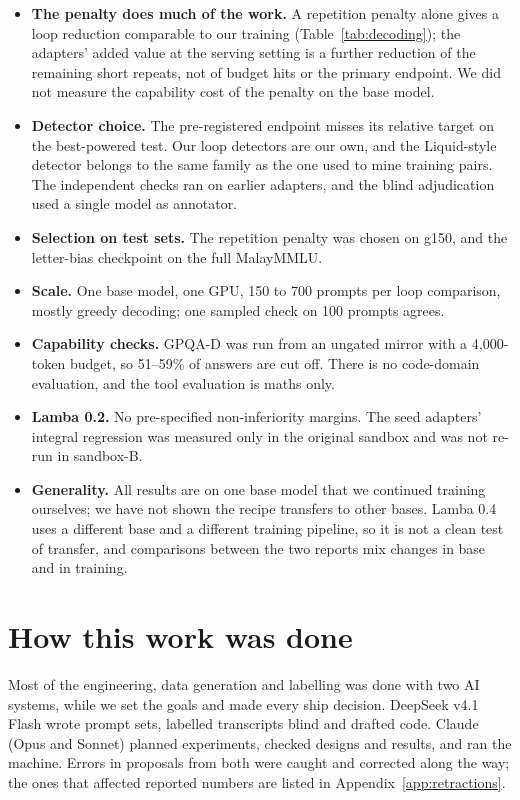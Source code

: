\documentclass[11pt]{article}
\begin{document}
\begin{itemize}
  \item \textbf{The penalty does much of the work.} A repetition penalty alone gives a loop reduction comparable to our training (Table~\ref{tab:decoding}); the adapters' added value at the serving setting is a further reduction of the remaining short repeats, not of budget hits or the primary endpoint. We did not measure the capability cost of the penalty on the base model.
  \item \textbf{Detector choice.} The pre-registered endpoint misses its relative target on the best-powered test. Our loop detectors are our own, and the Liquid-style detector belongs to the same family as the one used to mine training pairs. The independent checks ran on earlier adapters, and the blind adjudication used a single model as annotator.
  \item \textbf{Selection on test sets.} The repetition penalty was chosen on g150, and the letter-bias checkpoint on the full MalayMMLU.
  \item \textbf{Scale.} One base model, one GPU, 150 to 700 prompts per loop comparison, mostly greedy decoding; one sampled check on 100 prompts agrees.
  \item \textbf{Capability checks.} GPQA-D was run from an ungated mirror with a 4,000-token budget, so 51--59\% of answers are cut off. There is no code-domain evaluation, and the tool evaluation is maths only.
  \item \textbf{Lamba 0.2.} No pre-specified non-inferiority margins. The seed adapters' integral regression was measured only in the original sandbox and was not re-run in sandbox-B.
  \item \textbf{Generality.} All results are on one base model that we continued training ourselves; we have not shown the recipe transfers to other bases. Lamba 0.4 uses a different base and a different training pipeline, so it is not a clean test of transfer, and comparisons between the two reports mix changes in base and in training.
\end{itemize}

\section{How this work was done}

Most of the engineering, data generation and labelling was done with two AI systems, while we set the goals and made every ship decision. DeepSeek v4.1 Flash wrote prompt sets, labelled transcripts blind and drafted code. Claude (Opus and Sonnet) planned experiments, checked designs and results, and ran the machine. Errors in proposals from both were caught and corrected along the way; the ones that affected reported numbers are listed in Appendix~\ref{app:retractions}.
\end{document}
